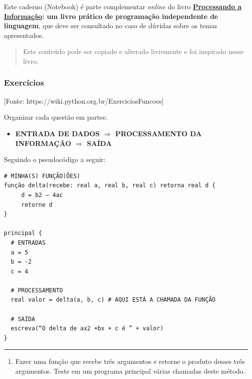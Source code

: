\documentclass[12pt,a4paper]{article}
\providecommand{\tightlist}{%
      \setlength{\itemsep}{0pt}\setlength{\parskip}{0pt}}
\begin{document}
Este caderno (Notebook) é parte complementar \emph{online} do livro
\textbf{\href{https://editora.ufabc.edu.br/matematica-e-ciencias-da-computacao/58-processando-a-informacao}{Processando
a Informação}: um livro prático de programação independente de
linguagem}, que deve ser consultado no caso de dúvidas sobre os temas
apresentados.

\begin{quote}
Este conteúdo pode ser copiado e alterado livremente e foi inspirado
nesse livro.
\end{quote}

    \hypertarget{exercuxedcios}{%
\subsubsection{Exercícios}\label{exercuxedcios}}

    {[}Fonte: https://wiki.python.org.br/ExerciciosFuncoes{]}

Organizar cada questão em partes:

\begin{itemize}
\tightlist
\item
  \textbf{ENTRADA DE DADOS \(\Rightarrow\) PROCESSAMENTO DA INFORMAÇÃO
  \(\Rightarrow\) SAÍDA}
\end{itemize}

Seguindo o pseudocódigo a seguir:

    \begin{verbatim}
# MINHA(S) FUNÇÃO(ÕES)
função delta(recebe: real a, real b, real c) retorna real d {
     d = b2 – 4ac
     retorne d
}

principal {
  # ENTRADAS
  a = 5
  b = -2
  c = 4

  # PROCESSAMENTO
  real valor = delta(a, b, c) # AQUI ESTÁ A CHAMADA DA FUNÇÃO
  
  # SAÍDA
  escreva(“O delta de ax2 +bx + c é ” + valor)
}
\end{verbatim}

    \begin{center}\rule{0.5\linewidth}{0.5pt}\end{center}

\begin{enumerate}
\def\labelenumi{\arabic{enumi}.}
\tightlist
\item
  Fazer uma função que recebe três argumentos e retorne o produto desses
  três argumentos. Teste em um programa principal várias chamadas deste
  método.
\end{enumerate}
\end{document}
